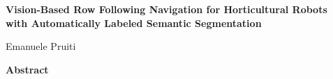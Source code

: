 \documentclass[11pt,a4paper]{article}
\begin{document}
\begin{center}
{\large\bfseries Vision-Based Row Following Navigation for Horticultural Robots\\with Automatically Labeled Semantic Segmentation\par}
\vspace{0.4em}
{Emanuele Pruiti\par}
\vspace{1em}
{\bfseries Abstract\par}
\end{center}


\end{document}

